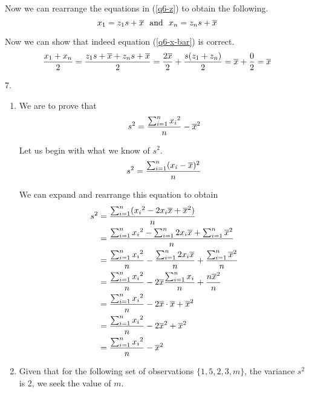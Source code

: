\documentclass[fleqn]{article}
\begin{document}
\begin{answers}
	Now we can rearrange the equations in (\ref{q6-z}) to obtain the following.
	\[
		x_1 = z_1 s + \overline{x}
		\ \text{ and } \
		x_n = z_n s + \overline{x}
	\]

	Now we can show that indeed equation (\ref{q6-x-bar}) is correct.
	\[\frac{x_1 + x_n}{2} = \frac{z_1 s + \overline{x} + z_n s + \overline{x}}{2} = \frac{2\overline{x}}{2} + \frac{s(z_1 + z_n)}{2} = \overline{x} + \frac{0}{2} = \overline{x}\]

	\item[7.]
	\begin{enumerate}
		\item %
		We are to prove that
		\[s^2 = \frac{\sum_{i=1}^n {x_i}^2}{n} - \overline{x}^2\]

		Let us begin with what we know of \(s^2\).
		\[s^2 = \frac{\sum_{i=1}^n (x_i - \overline{x})^2}{n}\]

		We can expand and rearrange this equation to obtain
		\begin{align*}
			s^2 & = \frac{\sum_{i=1}^n ({x_i}^2 - 2 x_i \overline{x} + \overline{x}^2)}{n}                                             \\
			    & = \frac{\sum_{i=1}^n {x_i}^2 - \sum_{i=1}^n 2 x_i \overline{x} + \sum_{i=1}^n \overline{x}^2}{n}                     \\
			    & = \frac{\sum_{i=1}^n {x_i}^2}{n} - \frac{\sum_{i=1}^n 2 x_i \overline{x}}{n} + \frac{\sum_{i=1}^n \overline{x}^2}{n} \\
			    & = \frac{\sum_{i=1}^n {x_i}^2}{n} - 2 \overline{x} \frac{\sum_{i=1}^n x_i}{n} + \frac{n \overline{x}^2}{n}            \\
			    & = \frac{\sum_{i=1}^n {x_i}^2}{n} - 2 \overline{x} \cdot \overline{x} + \overline{x}^2                                       \\
			    & = \frac{\sum_{i=1}^n {x_i}^2}{n} - 2 \overline{x}^2 + \overline{x}^2                                                 \\
			    & = \frac{\sum_{i=1}^n {x_i}^2}{n} - \overline{x}^2                                                             \\
		\end{align*}

		\item %
		Given that for the following set of observations \(\{1, 5, 2, 3, m\}\), the variance \(s^2\) is 2, we seek the value of \(m\).


\end{enumerate}
\end{answers}
\end{document}
